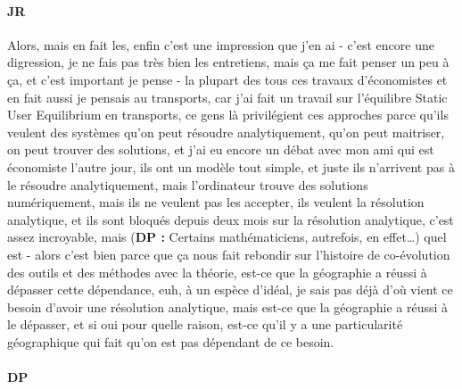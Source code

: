 \documentclass[12pt]{article}
\begin{document}
\paragraph{JR}

Alors, mais en fait les, enfin c'est une impression que j'en ai - c'est encore une digression, je ne fais pas très bien les entretiens, mais ça me fait penser un peu à ça, et c'est important je pense - la plupart des tous ces travaux d'économistes et en fait aussi je pensais au transports, car j'ai fait un travail sur l'équilibre Static User Equilibrium en transports, ce gens là privilégient ces approches parce qu'ils veulent des systèmes qu'on peut résoudre analytiquement, qu'on peut maitriser, on peut trouver des solutions, et j'ai eu encore un débat avec mon ami qui est économiste l'autre jour, ils ont un modèle tout simple, et juste ils n'arrivent pas à le résoudre analytiquement, mais l'ordinateur trouve des solutions numériquement, mais ils ne veulent pas les accepter, ils veulent la résolution analytique, et ils sont bloqués depuis deux mois sur la résolution analytique, c'est assez incroyable, mais (\textbf{DP : } Certains mathématiciens, autrefois, en effet\ldots) quel est - alors c'est bien parce que ça nous fait rebondir sur l'histoire de co-évolution des outils et des méthodes avec la théorie, est-ce que la géographie a réussi à dépasser cette dépendance, euh, à un espèce d'idéal, je sais pas déjà d'où vient ce besoin d'avoir une résolution analytique, mais est-ce que la géographie a réussi à le dépasser, et si oui pour quelle raison, est-ce qu'il y a une particularité géographique qui fait qu'on est pas dépendant de ce besoin.



\paragraph{DP}
\end{document}
